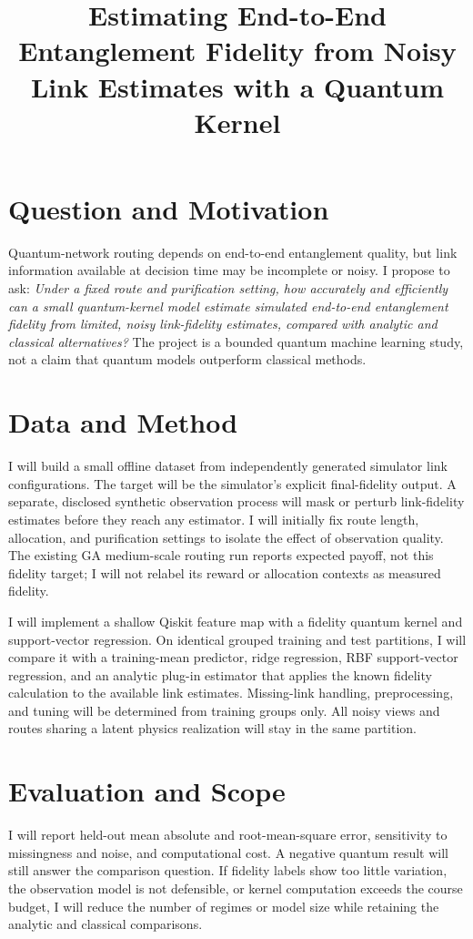 \documentclass[10pt,onecolumn]{IEEEtran}
\title{Estimating End-to-End Entanglement Fidelity from Noisy Link Estimates with a Quantum Kernel}
\author{\IEEEauthorblockN{Piter Garcia}
\IEEEauthorblockA{CSCI 739: Topics in Artificial Intelligence\\Final Project Proposal}}
\begin{document}
\maketitle

\section{Question and Motivation}
Quantum-network routing depends on end-to-end entanglement quality, but link information available at decision time may be incomplete or noisy. I propose to ask: \emph{Under a fixed route and purification setting, how accurately and efficiently can a small quantum-kernel model estimate simulated end-to-end entanglement fidelity from limited, noisy link-fidelity estimates, compared with analytic and classical alternatives?} The project is a bounded quantum machine learning study, not a claim that quantum models outperform classical methods.

\section{Data and Method}
I will build a small offline dataset from independently generated simulator link configurations. The target will be the simulator's explicit final-fidelity output. A separate, disclosed synthetic observation process will mask or perturb link-fidelity estimates before they reach any estimator. I will initially fix route length, allocation, and purification settings to isolate the effect of observation quality. The existing GA medium-scale routing run reports expected payoff, not this fidelity target; I will not relabel its reward or allocation contexts as measured fidelity.

I will implement a shallow Qiskit feature map with a fidelity quantum kernel and support-vector regression. On identical grouped training and test partitions, I will compare it with a training-mean predictor, ridge regression, RBF support-vector regression, and an analytic plug-in estimator that applies the known fidelity calculation to the available link estimates. Missing-link handling, preprocessing, and tuning will be determined from training groups only. All noisy views and routes sharing a latent physics realization will stay in the same partition.

\section{Evaluation and Scope}
I will report held-out mean absolute and root-mean-square error, sensitivity to missingness and noise, and computational cost. A negative quantum result will still answer the comparison question. If fidelity labels show too little variation, the observation model is not defensible, or kernel computation exceeds the course budget, I will reduce the number of regimes or model size while retaining the analytic and classical comparisons.
\end{document}
